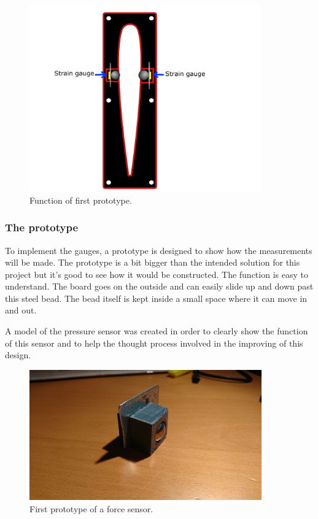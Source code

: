 \begin{figure}[H]
\begin{center}
	\includegraphics[width = 10cm]{Figures/Prototyp_1.png}
	\caption{Function of first prototype.}
	\label{Press_sens_impl}
\end{center}
\end{figure}

\subsubsection{The prototype}
To implement the gauges, a prototype is designed to show how the measurements will be made. The prototype is a bit bigger than the intended solution for this project but it's good to see how it would be constructed. The function is easy to understand. The board goes on the outside and can easily slide up and down past this steel bead. The bead itself is kept inside a small space where it can move in and out.

A model of the pressure sensor was created in order to clearly show the function of this sensor and to help the thought process involved in the improving of this design.

\begin{figure}[H]
\begin{center}
	\includegraphics[width = 10cm]{Figures/Press_sens_prot_1.png}
	\caption{First prototype of a force sensor.}
	\label{Press_sens_prot_1}
\end{center}
\end{figure}


